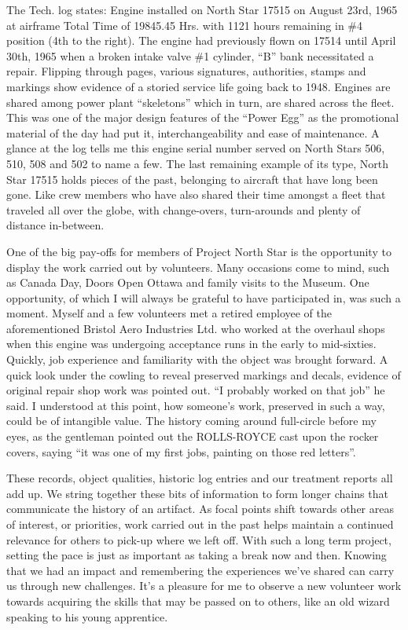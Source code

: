 The Tech. log states: Engine installed on North Star 17515 on August 23rd, 1965
at airframe Total Time of 19845.45 Hrs. with 1121 hours remaining in \#4
position (4th to the right). The engine had previously flown on 17514 until
April 30th, 1965 when a broken intake valve \@ \#1 cylinder, “B” bank
necessitated a repair. Flipping through pages, various signatures, authorities,
stamps and markings show evidence of a storied service life going back to 1948.
Engines are shared among power plant “skeletons” which in turn, are shared
across the fleet. This was one of the major design features of the “Power Egg”
as the promotional material of the day had put it, interchangeability and ease
of maintenance. A glance at the log tells me this engine serial number served
on North Stars 506, 510, 508 and 502 to name a few. The last remaining example
of its type, North Star 17515 holds pieces of the past, belonging to aircraft
that have long been gone. Like crew members who have also shared their time
amongst a fleet that traveled all over the globe, with change-overs,
turn-arounds and plenty of distance in-between.  

One of the big pay-offs for members of Project North Star is the opportunity to
display the work carried out by volunteers. Many occasions come to mind, such
as Canada Day, Doors Open Ottawa and family visits to the Museum. One
opportunity, of which I will always be grateful to have participated in, was
such a moment. Myself and a few volunteers met a retired employee of the
aforementioned Bristol Aero Industries Ltd. who worked at the overhaul shops
when this engine was undergoing acceptance runs in the early to mid-sixties.
Quickly, job experience and familiarity with the object was brought forward. A
quick look under the cowling to reveal preserved markings and decals, evidence
of original repair shop work was pointed out. “I probably worked on that job”
he said. I understood at this point, how someone’s work, preserved in such a
way, could be of intangible value. The history coming around full-circle before
my eyes, as the gentleman pointed out the ROLLS-ROYCE cast upon the rocker
covers, saying “it was one of my first jobs, painting on those red letters”. 


These records, object qualities, historic log entries and our treatment reports
all add up. We string together these bits of information to form longer chains
that communicate the history of an artifact. As focal points shift towards
other areas of interest, or priorities, work carried out in the past helps
maintain a continued relevance for others to pick-up where we left off. With
such a long term project, setting the pace is just as important as taking a
break now and then. Knowing that we had an impact and remembering the
experiences we’ve shared can carry us through new challenges. It’s a pleasure
for me to observe a new volunteer work towards acquiring the skills that may be
passed on to others, like an old wizard speaking to his young apprentice. 


